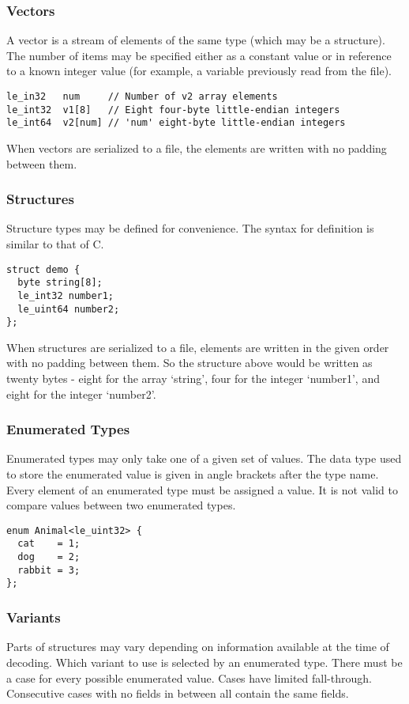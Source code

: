 \documentclass[10pt]{article}
\begin{document}
\subsubsection{Vectors}
A vector is a stream of elements of the same type (which may be a structure).
The number of items may be specified either as a constant value or in reference to a known integer value (for
example, a variable previously read from the file).

\begin{verbatim}
le_in32   num     // Number of v2 array elements
le_int32  v1[8]   // Eight four-byte little-endian integers
le_int64  v2[num] // 'num' eight-byte little-endian integers
\end{verbatim}

When vectors are serialized to a file, the elements are written with no padding between them.

\subsubsection{Structures}
Structure types may be defined for convenience.
The syntax for definition is similar to that of C.

\begin{verbatim}
struct demo {
  byte string[8];
  le_int32 number1;
  le_uint64 number2;
};
\end{verbatim}

When structures are serialized to a file, elements are written in the given order with no padding between them.
So the structure above would be written as twenty bytes - eight for the array `string', four for the integer `number1',
and eight for the integer `number2'.

\subsubsection{Enumerated Types}
Enumerated types may only take one of a given set of values.
The data type used to store the enumerated value is given in angle brackets after the type name.
Every element of an enumerated type must be assigned a value.
It is not valid to compare values between two enumerated types.

\begin{verbatim}
enum Animal<le_uint32> {
  cat    = 1;
  dog    = 2;
  rabbit = 3;
};
\end{verbatim}

\subsubsection{Variants}
Parts of structures may vary depending on information available at the time of decoding.
Which variant to use is selected by an enumerated type.
There must be a case for every possible enumerated value.
Cases have limited fall-through.
Consecutive cases with no fields in between all contain the same fields.
\end{document}
